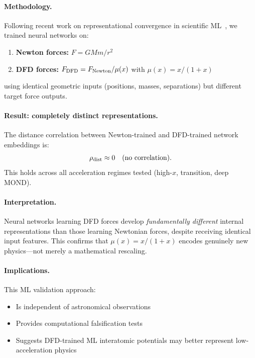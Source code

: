 \paragraph{Methodology.}
Following recent work on representational convergence in scientific ML~\cite{Edamadaka2024}, we trained neural networks on:
\begin{enumerate}
\item \textbf{Newton forces:} $F = GMm/r^2$
\item \textbf{DFD forces:} $F_{\rm DFD} = F_{\rm Newton}/\mu(x)$ with $\mu(x) = x/(1+x)$
\end{enumerate}
using identical geometric inputs (positions, masses, separations) but different target force outputs.

\paragraph{Result: completely distinct representations.}
The distance correlation between Newton-trained and DFD-trained network embeddings is:
\begin{equation}
\rho_{\rm dist} \approx 0 \quad \text{(no correlation)}.
\end{equation}
This holds across all acceleration regimes tested (high-$x$, transition, deep MOND).

\paragraph{Interpretation.}
Neural networks learning DFD forces develop \textit{fundamentally different} internal representations than those learning Newtonian forces, despite receiving identical input features. This confirms that $\mu(x) = x/(1+x)$ encodes genuinely new physics---not merely a mathematical rescaling.

\paragraph{Implications.}
This ML validation approach:
\begin{itemize}
\item Is independent of astronomical observations
\item Provides computational falsification tests
\item Suggests DFD-trained ML interatomic potentials may better represent low-acceleration physics
\end{itemize}

